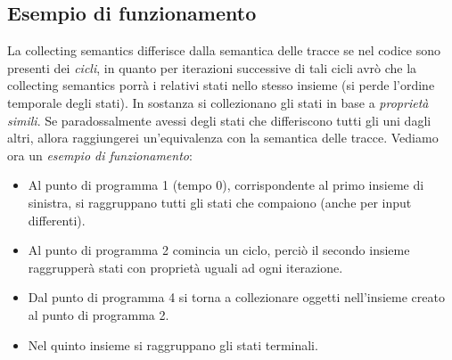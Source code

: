 \documentclass[a4paper,oneside,titlepage]{book}
\begin{document}
\subsection{Esempio di funzionamento}
La collecting semantics differisce dalla semantica delle tracce se nel codice sono presenti dei \textit{cicli}, in quanto per iterazioni successive di tali cicli avrò che la collecting semantics porrà i relativi stati nello stesso insieme (si perde l'ordine temporale degli stati). In sostanza si collezionano gli stati in base a \textit{proprietà simili}. Se paradossalmente avessi degli stati che differiscono tutti gli uni dagli altri, allora raggiungerei un'equivalenza con la semantica delle tracce. Vediamo ora un \textit{esempio di funzionamento}:
\begin{itemize}
    \item Al punto di programma 1 (tempo 0), corrispondente al primo insieme di sinistra, si raggruppano tutti gli stati che compaiono (anche per input differenti).
    \item Al punto di programma 2 comincia un ciclo, perciò il secondo insieme raggrupperà stati con proprietà uguali ad ogni iterazione.
    \item Dal punto di programma 4 si torna a collezionare oggetti nell'insieme creato al punto di programma 2.
    \item Nel quinto insieme si raggruppano gli stati terminali.
\end{itemize}
\end{document}
